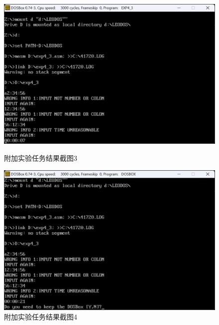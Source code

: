 \documentclass[12pt, a4paper, oneside]{ctexart}
\begin{document}
\begin{figure}[H]
    \centering
    \begin{minipage}{0.45\textwidth}
    \centering
    \includegraphics[scale=0.48]{pic/exp4-2-counting.png}
    \caption{附加实验任务结果截图3}
    \label{附加实验任务结果截图3}
    \end{minipage}
    \hspace{0.05\textwidth}
    \begin{minipage}{0.45\textwidth}
    \centering
    \includegraphics[scale=0.48]{pic/exp4-2-end.png}
    \caption{附加实验任务结果截图4}
    \label{附加实验任务结果截图4}
    \end{minipage}
\end{figure}
\end{document}
